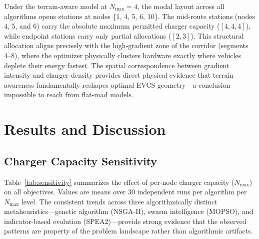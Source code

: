 \documentclass[conference]{IEEEtran}
\begin{document}
Under the terrain-aware model at $N_{\max} = 4$, the modal layout across all algorithms opens stations at nodes \{1, 4, 5, 6, 10\}. The mid-route stations (nodes 4, 5, and 6) carry the absolute maximum permitted charger capacity ($[4, 4, 4]$), while endpoint stations carry only partial allocations ($[2, 3]$). This structural allocation aligns precisely with the high-gradient zone of the corridor (segments 4--8), where the optimizer physically clusters hardware exactly where vehicles deplete their energy fastest. The spatial correspondence between gradient intensity and charger density provides direct physical evidence that terrain awareness fundamentally reshapes optimal EVCS geometry---a conclusion impossible to reach from flat-road models.

\section{Results and Discussion}
\label{sec:results}

\subsection{Charger Capacity Sensitivity}

Table~\ref{tab:sensitivity} summarizes the effect of per-node charger capacity ($N_{\max}$) on all objectives. Values are means over 30 independent runs per algorithm per $N_{\max}$ level. The consistent trends across three algorithmically distinct metaheuristics---genetic algorithm (NSGA-II), swarm intelligence (MOPSO), and indicator-based evolution (SPEA2)---provide strong evidence that the observed patterns are property of the problem landscape rather than algorithmic artifacts.
\end{document}
